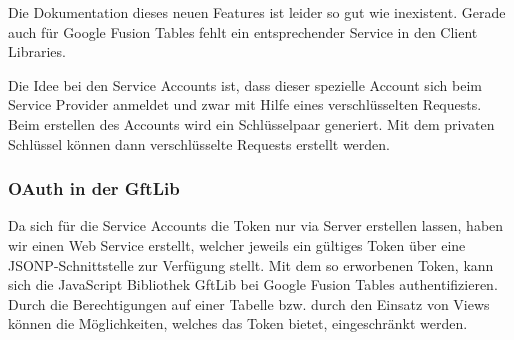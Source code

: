 Die Dokumentation dieses neuen Features ist leider so gut wie inexistent. Gerade auch für Google Fusion Tables fehlt ein entsprechender Service in den Client Libraries.

Die Idee bei den Service Accounts ist, dass dieser spezielle Account sich beim Service Provider anmeldet und zwar mit Hilfe eines verschlüsselten Requests. Beim erstellen des Accounts wird ein Schlüsselpaar generiert. Mit dem privaten Schlüssel können dann verschlüsselte Requests erstellt werden.

\subsubsection{OAuth in der GftLib}
Da sich für die Service Accounts die Token nur via Server erstellen lassen, haben wir einen Web Service erstellt, welcher jeweils ein gültiges Token über eine \gls{JSONP}-Schnittstelle zur Verfügung stellt. Mit dem so erworbenen Token, kann sich die JavaScript Bibliothek GftLib bei Google Fusion Tables authentifizieren. Durch die Berechtigungen auf einer Tabelle bzw. durch den Einsatz von Views können die Möglichkeiten, welches das Token bietet, eingeschränkt werden.